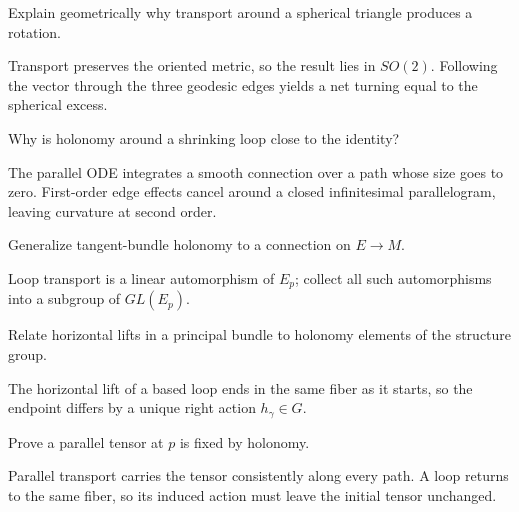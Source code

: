 \begin{problem}\label{prob:vii25-05}
Explain geometrically why transport around a spherical triangle produces a rotation.
\end{problem}
\begin{solution}
Transport preserves the oriented metric, so the result lies in \(SO(2)\). Following the vector through the three geodesic edges yields a net turning equal to the spherical excess.
\end{solution}


\begin{problem}\label{prob:vii25-06}
Why is holonomy around a shrinking loop close to the identity?
\end{problem}
\begin{solution}
The parallel ODE integrates a smooth connection over a path whose size goes to zero. First-order edge effects cancel around a closed infinitesimal parallelogram, leaving curvature at second order.
\end{solution}


\begin{problem}\label{prob:vii25-07}
Generalize tangent-bundle holonomy to a connection on \(E\to M\).
\end{problem}
\begin{solution}
Loop transport is a linear automorphism of \(E_p\); collect all such automorphisms into a subgroup of \(GL(E_p)\).
\end{solution}


\begin{problem}\label{prob:vii25-08}
Relate horizontal lifts in a principal bundle to holonomy elements of the structure group.
\end{problem}
\begin{solution}
The horizontal lift of a based loop ends in the same fiber as it starts, so the endpoint differs by a unique right action \(h_\gamma\in G\).
\end{solution}


\begin{problem}\label{prob:vii25-09}
Prove a parallel tensor at \(p\) is fixed by holonomy.
\end{problem}
\begin{solution}
Parallel transport carries the tensor consistently along every path. A loop returns to the same fiber, so its induced action must leave the initial tensor unchanged.
\end{solution}


